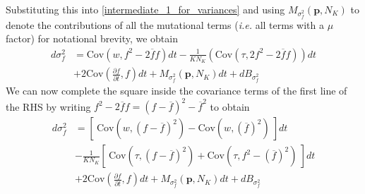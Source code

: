 Substituting this into \eqref{intermediate_1_for_variances} and using $M_{\sigma^2_f}(\mathbf{p},N_K)$ to denote the contributions of all the mutational terms (\emph{i.e.} all terms with a $\mu$ factor) for notational brevity, we obtain
\begin{equation}
\begin{aligned}
d\sigma^2_{f} &= \textrm{Cov}(w,f^2 - 2\overline{f}f)dt - \frac{1}{KN_K}\left(\textrm{Cov}(\tau,2f^2 - 2\overline{f}f)\right)dt\\
&+ 2\textrm{Cov}\left(\frac{\partial f}{\partial t},f\right)dt + M_{\sigma^2_f}(\mathbf{p},N_K)dt + dB_{\sigma^2_{f}}
\end{aligned}
\end{equation}
We can now complete the square inside the covariance terms of the first line of the RHS by writing $f^2 - 2\overline{f}f = (f - \overline{f})^2 - \overline{f}^2$ to obtain
\begin{equation}
\begin{aligned}
d\sigma^2_{f} &= \left[ \ \textrm{Cov}\left(w,(f - \overline{f})^2\right)-\textrm{Cov}\left(w, {\left(\overline{f}\right)}^2\right) \ \right]dt\\[12pt]
&- \frac{1}{KN_K}\left[ \ \textrm{Cov}\left(\tau,(f - \overline{f})^2\right) + \textrm{Cov}\left(\tau,f^2 - {\left(\overline{f}\right)}^2\right) \ \right]dt\\[12pt]
& + 2\textrm{Cov}\left(\frac{\partial f}{\partial t},f\right)dt + M_{\sigma^2_f}(\mathbf{p},N_K)dt + dB_{\sigma^2_{f}}
\end{aligned}
\end{equation}

